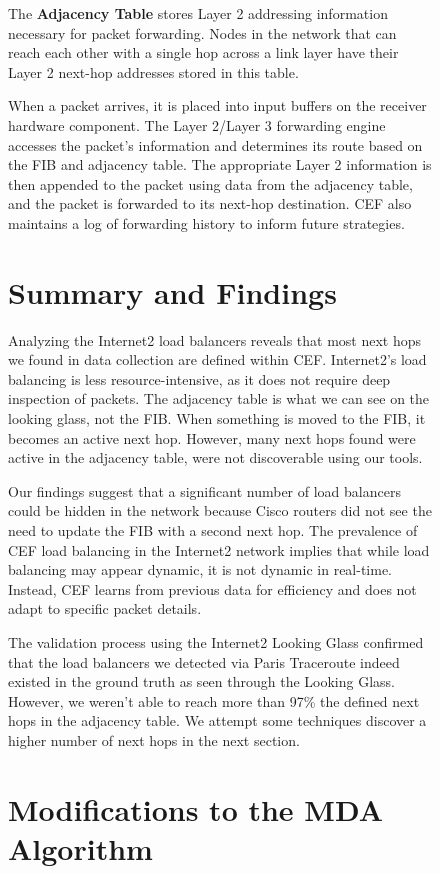 \documentclass[12pt]{cwru_thesis}
\begin{document}
\begin{figure}[h!]
The \textbf{Adjacency Table} stores Layer 2 addressing information necessary for packet forwarding. Nodes in the network that can reach each other with a single hop across a link layer have their Layer 2 next-hop addresses stored in this table. 

When a packet arrives, it is placed into input buffers on the receiver hardware component. The Layer 2/Layer 3 forwarding engine accesses the packet's information and determines its route based on the FIB and adjacency table. The appropriate Layer 2 information is then appended to the packet using data from the adjacency table, and the packet is forwarded to its next-hop destination. CEF also maintains a log of forwarding history to inform future strategies.

\section{Summary and Findings}

Analyzing the Internet2 load balancers reveals that most next hops we found in data collection are defined within CEF. Internet2's load balancing is less resource-intensive, as it does not require deep inspection of packets. The adjacency table is what we can see on the looking glass, not the FIB. When something is moved to the FIB, it becomes an active next hop. However, many next hops found were active in the adjacency table, were not discoverable using our tools.

Our findings suggest that a significant number of load balancers could be hidden in the network because Cisco routers did not see the need to update the FIB with a second next hop. The prevalence of CEF load balancing in the Internet2 network implies that while load balancing may appear dynamic, it is not dynamic in real-time. Instead, CEF learns from previous data for efficiency and does not adapt to specific packet details.

The validation process using the Internet2 Looking Glass confirmed that the load balancers we detected via Paris Traceroute indeed existed in the ground truth as seen through the Looking Glass. However, we weren't able to reach more than 97\% the defined next hops in the adjacency table. We attempt some techniques discover a higher number of next hops in the next section. 


\section{Modifications to the MDA Algorithm}


\end{figure}
\end{document}

